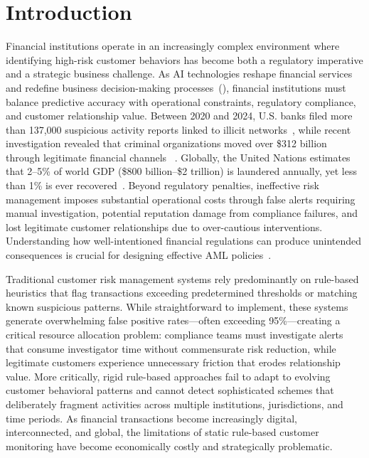 \documentclass[11pt,english]{article}
\begin{document}
\section{Introduction}
Financial institutions operate in an increasingly complex environment where identifying high-risk customer behaviors has become both a regulatory imperative and a strategic business challenge. As AI technologies reshape financial services and redefine business decision-making processes~(\cite{agrawal2019artificial}), financial institutions must balance predictive accuracy with operational constraints, regulatory compliance, and customer relationship value. Between 2020 and 2024, U.S. banks filed more than 137,000 suspicious activity reports linked to illicit networks~\parencite{website:FinCEN}, while recent investigation revealed that criminal organizations moved over \$312 billion through legitimate financial channels ~\parencite{website:WSJ}. Globally, the United Nations estimates that 2–5\% of world GDP (\$800 billion–\$2 trillion) is laundered annually, yet less than 1\% is ever recovered~\parencite{website:UN}. Beyond regulatory penalties, ineffective risk management imposes substantial operational costs through false alerts requiring manual investigation, potential reputation damage from compliance failures, and lost legitimate customer relationships due to over-cautious interventions. Understanding how well-intentioned financial regulations can produce unintended consequences is crucial for designing effective AML policies~\parencite{bao2017ni}.

Traditional customer risk management systems rely predominantly on rule-based heuristics that flag transactions exceeding predetermined thresholds or matching known suspicious patterns. While straightforward to implement, these systems generate overwhelming false positive rates—often exceeding 95\%—creating a critical resource allocation problem: compliance teams must investigate alerts that consume investigator time without commensurate risk reduction, while legitimate customers experience unnecessary friction that erodes relationship value. More critically, rigid rule-based approaches fail to adapt to evolving customer behavioral patterns and cannot detect sophisticated schemes that deliberately fragment activities across multiple institutions, jurisdictions, and time periods. As financial transactions become increasingly digital, interconnected, and global, the limitations of static rule-based customer monitoring have become economically costly and strategically problematic. 
\end{document}
